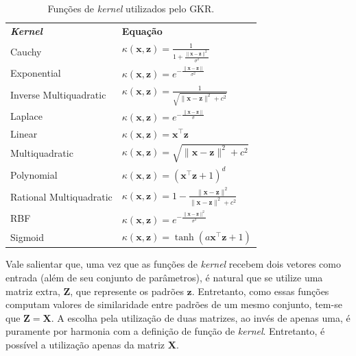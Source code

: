 \begin{table}[H]
    \caption{Funções de \textit{kernel} utilizados pelo GKR.}
    \begin{center} \label{tab:gkr-kernels}
        {
        \def\arraystretch{1.8}\tabcolsep=10pt
        \begin{tabular}{l@{\hskip 18pt}l}
            \hline\noalign{\smallskip}
            \textbf{\textit{Kernel}} & \textbf{Equação} \\
            \noalign{\smallskip}
            \hline
            \noalign{\smallskip}
            Cauchy 		            & $\kappa(\mathbf{x},\mathbf{z}) = \frac{1}{1 + \frac{\|\mathbf{x} - \mathbf{z}\|^2}{\sigma^2}}$ \\
            Exponential             & $\kappa(\mathbf{x},\mathbf{z}) = e^{-\frac{\|\mathbf{x} - \mathbf{z}\|}{\sigma^2}}$ \\
            Inverse Multiquadratic  & $\kappa(\mathbf{x},\mathbf{z}) = \frac{1}{\sqrt{\|\mathbf{x} - \mathbf{z}\|^2 + c^2}}$ \\
            Laplace		            & $\kappa(\mathbf{x},\mathbf{z}) = e^{-\frac{\|\mathbf{x} - \mathbf{z}\|}{\sigma}}$ \\
            Linear		            & $\kappa(\mathbf{x},\mathbf{z}) = \mathbf{x}^{\top}\mathbf{z}$ \\
            Multiquadratic          & $\kappa(\mathbf{x},\mathbf{z}) = \sqrt{\|\mathbf{x} - \mathbf{z}\|^2 + c^2}$ \\
            Polynomial	            & $\kappa(\mathbf{x},\mathbf{z}) = (\mathbf{x}^{\top}\mathbf{z} + 1)^d$ \\
            Rational Multiquadratic & $\kappa(\mathbf{x},\mathbf{z}) = 1 - \frac{\|\mathbf{x} - \mathbf{z}\|^2}{\|\mathbf{x} - \mathbf{z}\|^2 + c^2}$ \\
            RBF	                    & $\kappa(\mathbf{x},\mathbf{z}) = e^{-\frac{\|\mathbf{x} - \mathbf{z}\|^2}{\sigma^2}}$ \\
            Sigmoid         		& $\kappa(\mathbf{x},\mathbf{z}) = \tanh(a\mathbf{x}^{\top}\mathbf{z} + 1)$ \\
            \hline
        \end{tabular}
    }
    \end{center}
    \begin{center}
    \end{center}
\end{table}

Vale salientar que, uma vez que as funções de \textit{kernel} recebem dois vetores como entrada (além de seu conjunto de parâmetros), é natural que se utilize uma matriz extra, $\mathbf{Z}$, que represente os padrões $\mathbf{z}$. Entretanto, como essas funções computam valores de similaridade entre padrões de um mesmo conjunto, tem-se que $\mathbf{Z} = \mathbf{X}$. A escolha pela utilização de duas matrizes, ao invés de apenas uma, é puramente por harmonia com a definição de função de \textit{kernel}. Entretanto, é possível a utilização apenas da matriz $\mathbf{X}$.

